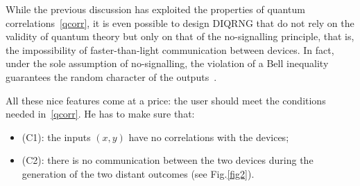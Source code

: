 \documentclass[11pt,a4paper]{article}
\begin{document}
%

While the previous discussion has exploited the properties of quantum correlations~\eqref{qcorr}, it is even possible to design DIQRNG that do not rely on the validity of quantum theory but only on that of the no-signalling principle, that is, the impossibility of faster-than-light communication between devices. In fact, under the sole assumption of no-signalling, the violation of a Bell inequality guarantees the random character of the outputs~\cite{Valentini, BHK05, MAG, bkp, PhDColbeck, Pironio, Hall}.


All these nice features come at a price: the user should meet the conditions needed in~\eqref{qcorr}. %
He has to make sure that:

\begin{itemize}
\item (C1): the inputs $(x, y)$ have no correlations with the devices;
\item (C2): there is no communication between the two devices during the generation of the two distant outcomes (see Fig.\ref{fig2}).
\end{itemize}
\end{document}
